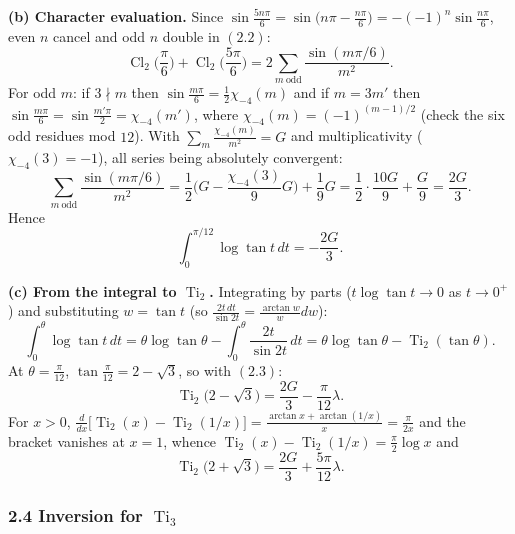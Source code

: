 \documentclass[11pt]{article}
\theoremstyle{remark}
\begin{document}
\textbf{(b) Character evaluation.} Since $\sin\frac{5n\pi}{6}=\sin\big(n\pi-\frac{n\pi}6\big)=-(-1)^n\sin\frac{n\pi}{6}$, even $n$ cancel and odd $n$ double in $(2.2)$:
\[
\operatorname{Cl}_2\!\Big(\frac{\pi}{6}\Big)+\operatorname{Cl}_2\!\Big(\frac{5\pi}{6}\Big)=2\sum_{m\ \mathrm{odd}}\frac{\sin(m\pi/6)}{m^2}.
\]
For odd $m$: if $3\nmid m$ then $\sin\frac{m\pi}{6}=\frac12\chi_{-4}(m)$ and if $m=3m'$ then $\sin\frac{m\pi}{6}=\sin\frac{m'\pi}{2}=\chi_{-4}(m')$, where $\chi_{-4}(m)=(-1)^{(m-1)/2}$ (check the six odd residues mod $12$). With $\sum_m\frac{\chi_{-4}(m)}{m^2}=G$ and multiplicativity ($\chi_{-4}(3)=-1$), all series being absolutely convergent:
\[
\sum_{m\ \mathrm{odd}}\frac{\sin(m\pi/6)}{m^2}
=\frac12\Big(G-\frac{\chi_{-4}(3)}{9}G\Big)+\frac{1}{9}G=\frac12\cdot\frac{10G}{9}+\frac G9=\frac{2G}{3}.
\]
Hence
\begin{equation*}
\int_0^{\pi/12}\log\tan t\,dt=-\frac{2G}{3}. \tag{2.3}
\end{equation*}

\textbf{(c) From the integral to $\operatorname{Ti}_2$.} Integrating by parts ($t\log\tan t\to0$ as $t\to0^+$) and substituting $w=\tan t$ (so $\frac{2t\,dt}{\sin 2t}=\frac{\arctan w}{w}dw$):
\[
\int_0^{\theta}\log\tan t\,dt=\theta\log\tan\theta-\int_0^{\theta}\frac{2t}{\sin2t}\,dt=\theta\log\tan\theta-\operatorname{Ti}_2(\tan\theta).
\]
At $\theta=\frac{\pi}{12}$, $\tan\frac{\pi}{12}=2-\sqrt3$, so with $(2.3)$:
\begin{equation*}
\operatorname{Ti}_2\!\big(2-\sqrt3\big)=\frac{2G}{3}-\frac{\pi}{12}\lambda. \tag{2.4}
\end{equation*}
For $x>0$, $\frac{d}{dx}\big[\operatorname{Ti}_2(x)-\operatorname{Ti}_2(1/x)\big]=\frac{\arctan x+\arctan(1/x)}{x}=\frac{\pi}{2x}$ and the bracket vanishes at $x=1$, whence $\operatorname{Ti}_2(x)-\operatorname{Ti}_2(1/x)=\frac\pi2\log x$ and
\begin{equation*}
\operatorname{Ti}_2\!\big(2+\sqrt3\big)=\frac{2G}{3}+\frac{5\pi}{12}\lambda. \tag{2.5}
\end{equation*}

\subsubsection*{2.4 Inversion for $\operatorname{Ti}_3$}
\end{document}
